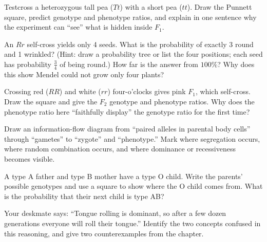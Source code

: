 \begin{sikaoti}
\item Testcross a heterozygous tall pea ($Tt$) with a short pea ($tt$). Draw the Punnett square, predict genotype and phenotype ratios, and explain in one sentence why the experiment can ``see'' what is hidden inside $F_1$.
\item An $Rr$ self-cross yields only 4 seeds. What is the probability of exactly 3 round and 1 wrinkled? (Hint: draw a probability tree or list the four positions; each seed has probability $\frac{3}{4}$ of being round.) How far is the answer from $100\%$? Why does this show Mendel could not grow only four plants?
\item Crossing red ($RR$) and white ($rr$) four-o'clocks gives pink $F_1$, which self-cross. Draw the square and give the $F_2$ genotype and phenotype ratios. Why does the phenotype ratio here ``faithfully display'' the genotype ratio for the first time?
\item Draw an information-flow diagram from ``paired alleles in parental body cells'' through ``gametes'' to ``zygote'' and ``phenotype.'' Mark where segregation occurs, where random combination occurs, and where dominance or recessiveness becomes visible.
\item A type A father and type B mother have a type O child. Write the parents' possible genotypes and use a square to show where the O child comes from. What is the probability that their next child is type AB?
\item Your deskmate says: ``Tongue rolling is dominant, so after a few dozen generations everyone will roll their tongue.'' Identify the two concepts confused in this reasoning, and give two counterexamples from the chapter.
\end{sikaoti}
